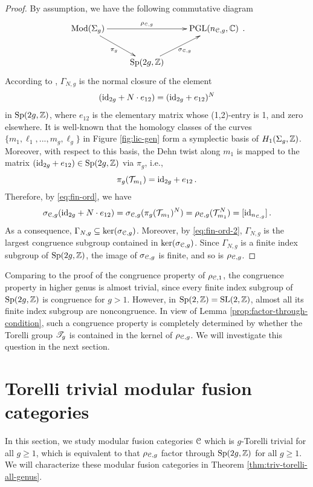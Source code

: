 \documentclass[11pt]{article}
\begin{document}
\begin{proof}
By assumption, we have the following commutative diagram 
\begin{equation}
\xymatrix{
\mcg{g} \ar^-{\RTrep{\cC}{g}}[rr] \ar_-{\pi_g}[dr] && \PGL(\ncg{\cC}{g}, \bC) \\
&\Sp(2g, \bZ) \ar_-{\s_{\cC, g}}[ur]&
}    \,.
\end{equation}
According to \cite[Satz 10]{Men65}, $\Gamma_{N, g}$ is the normal closure of the element 
$$({\operatorname{id}}_{2g} + N \cdot e_{12}) = ({\operatorname{id}}_{2g} + e_{12})^N$$ 
in ${\operatorname{Sp}}(2g, \mathbb{Z})$, where $e_{12}$ is the elementary matrix whose (1,2)-entry is 1, and zero elsewhere. It is well-known that the homology classes of the curves $\{m_1, \ell_1, ..., m_g, \ell_g\}$ in Figure \ref{fig:lic-gen} form a symplectic basis of $H_1(\Sigma_g, {\mathbb{Z}})$. Moreover, with respect to this basis, the Dehn twist along $m_1$ is mapped to the matrix $({\operatorname{id}}_{2g}+e_{12}) \in {\operatorname{Sp}}(2g, {\mathbb{Z}})$ via $\pi_g$, i.e., 
\begin{equation}
\label{eq:lifting}
\pi_g(\dt_{m_{1}}) = \id_{2g}+e_{12}\,.
\end{equation}
Therefore, by \eqref{eq:fin-ord}, we have 
\[
\s_{\cC, g}(\id_{2g}+N\cdot e_{12})
=
\s_{\cC, g}(\pi_g(\dt_{m_{1}})^N)
=
\RTrep{\CC}{g}(\dt_{m_{1}}^N)
=
[\id_{\ncg{\cC}{g}}]\,.
\]
As a consequence, $\Gamma_{N, g} \subseteq \operatorname{ker}({\sigma}_{\mathcal{C}, g})$. Moreover, by \eqref{eq:fin-ord-2}, $\Gamma_{N, g}$ is the largest congruence subgroup contained in $\operatorname{ker}({\sigma}_{\mathcal{C}, g})$. Since $\Gamma_{N, g}$ is a finite index subgroup of ${\operatorname{Sp}}(2g, \mathbb{Z})$, the image of ${\sigma}_{\mathcal{C}, g}$ is finite, and so is $\rho_{{\mathcal{C}}, {g}}$.
\end{proof}
 


Comparing to the proof of the congruence property of $\rho_{{\mathcal{C}}, {1}}$,  the congruence property in higher genus is almost trivial, since every finite index subgroup of ${{\operatorname{Sp}}(2g,{\mathbb{Z}})}$ is congruence for $g > 1$. However, in ${\operatorname{Sp}}(2,{\mathbb{Z}})= {\operatorname{SL}}(2,{\mathbb{Z}})$, almost all its finite index subgroup are noncongruence. In view of Lemma \ref{prop:factor-through-condition}, such a congruence property is completely determined by whether the Torelli group $\mathscr{T}_{g}$ is contained in the kernel of $\rho_{{\mathcal{C}}, {g}}$.
We will investigate this question in the next section. 


\section{Torelli trivial modular fusion categories} \label{s3}
In this section, we study modular fusion categories $\mathcal{C}$ which is $g$-Torelli trivial for all $g \ge 1$, which is equivalent to that $\rho_{{\mathcal{C}}, {g}}$ factor through ${\operatorname{Sp}}(2g, {\mathbb{Z}})$ for all $g \ge 1$. We will characterize these modular fusion categories in Theorem \ref{thm:triv-torelli-all-genus}. 
\end{document}
